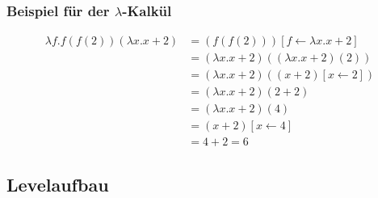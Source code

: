 \documentclass{scrartcl}
\begin{document}
\begin{minipage}{1\textwidth}
\subsubsection{Beispiel für der \texorpdfstring{$\lambda$}{Lambda}-Kalkül}
\[
	\begin{aligned}
		\lambda f.f(f(2))(\lambda x.x+2)&= (f(f(2)))[f \leftarrow \lambda x.x+2] \\
		&= (\lambda x.x+2)((\lambda x.x+2)(2)) \\
		&= (\lambda x.x+2)((x+2)[x \leftarrow 2]) \\
		&= (\lambda x.x+2)(2 + 2) \\
		&= (\lambda x.x+2)(4) \\
		&= (x+2)[x \leftarrow 4] \\
		&= 4 + 2 = 6
	\end{aligned}
\]
\end{minipage}


\subsection{Levelaufbau}  \label{subsection:Levelaufbau}
\end{document}
